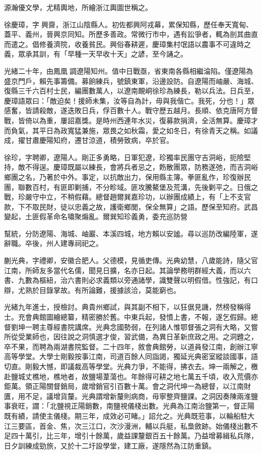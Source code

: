 \begin{pinyinscope}
源瀚優文學，尤精輿地，所繪浙江輿圖世稱之。

徐慶璋，字興齋，浙江山陰縣人。初佐都興阿戎幕，累保知縣，歷任奉天寬甸、蓋平、義州，晉興京同知。所歷多善政。常微行市中，遇有訟爭者，輒為剖其曲直而遣之。倡修養濟院，收養貧民。興俗春耕遲，慶璋集村氓語以農事不可違時之義，眾承其訓，有「早種一天早收十天」之諺，至今誦之。

光緒二十年，由鳳凰調遼陽知州。值中日戰亟，省東南各縣相繼淪陷。僅遼陽為盛京門戶，賴先事籌備。募餉練兵，號鎮東軍，沿邊設防。自遼陽而岫嚴、海城、復縣三千六百村士民，編團數萬人，以遼南靦峒徐珍為練長，勒以兵法。日兵至，慶璋語眾曰：「敵迫矣！援師未集，汝等自為計，毋與我偕亡。我死，分也！」眾感奮，皆請殺敵，遂迭敗日兵，俘百數十人。戰守歷五越月。長順、依克唐阿方督戰，皆倚以為重，屢詔嘉獎。是時州西連年水災，復募款捐濟，全活無算。慶璋才而負氣，其平日為政寬猛兼施，眾畏之如秋霜，愛之如冬日，有徐青天之稱。如議成，擢甘肅慶陽知府，遷甘涼道，積勞致病，卒於官。

徐珍，字聘卿，遼陽人。剛正多勇略，日軍犯遼，珍獨率民團守吉洞峪，扼險堅持，敵不得逞。慶璋既屬以練長，會將兵者忌之，飭散團眾，防務遂弛，而吉洞峪鄉團之名，乃著於中外。事定，以抗敵出力，保用縣主簿。拳匪亂作，珍復辦民團，聯數百村，有匪即剿捕，不分畛域。匪攻騰鰲堡及荒溝，先後剿平之。日俄之戰，珍嚴守中立，不稍假藉。總督趙爾巽嘉珍功，以辦團成績上，有「上不支官款，下不取民財，徒以忠義之故，護衛鄉閭，保全無算」之語。歷保至知府。武昌變起，土匪假革命名嘯聚煽亂。爾巽知珍義勇，委充巡防營

幫統，分防遼陽、海城、岫巖、本溪四城，地方賴以安謐。尋以巡防改編陸軍，遂辭職。卒後，州人建專祠祀之。

蒯光典，字禮卿，安徽合肥人。父德模，見循吏傳。光典幼慧，八歲能詩，隨父官江南，所師友多當代名儒，聞見日擴，名亦日起。其論學務明群經大義，而以六書、九數為樞紐，治六書則必求義類以旁通諸學，識雙聲以明假借。性強記，有口辯，尤熟於目錄掌故。有所論難，援據該洽，莫能窮也。

光緒九年進士，授檢討。典貴州鄉試，與其副不相下，以狂倨見譏，然榜發稱得士。充會典館圖繪總纂，精密勝於舊。中東兵起，發憤上書，不報，遂乞假歸。總督劉坤一聘主尊經書院講席。光典念國勢弱，在列諸人惟鄂督張之洞有大略，又嘗所從受業師也，因往說之洞慎選才俊，習武備，為異日革新庶政之用。之洞韙之，卒不果，而聘為兩湖書院監督。二十四年，敘會典館勞，以道員發江南，創辦江寧高等學堂。大學士剛毅按事江南，司道百餘人同詣謁，獨延光典密室縱談國事，語切直。剛毅大憾，即議裁高等學堂。光典力爭，不能得，拂衣去。坤一兩解之，檄赴鹽城丈樵地，樵地者，故鹽場葦蕩也。年餘得可耕之地七萬五千頃，收入荒價亦鉅萬。領正陽關督銷局，歲增銷官引百數十萬。會之洞代坤一為總督，以江南財匱，用不足，議增貨釐。光典謂增新釐則病商，毋寧整齊鹽課。之洞因奏陳兩淮鹽事衰旺，謂：「北鹽視正陽銷數，南鹽視儀棧出數。光典為江南治鹽第一，督正陽既有績，請使主儀棧。期三年，成效必可睹。」詔允之。光典既蒞事，以輪船駐大江三要區，首金、焦，次三江口，次沙漫洲，輔以兵艇，私梟斂跡。始儀棧出數不足四十萬引，比三年，增引十餘萬，歲益課釐銀百五十餘萬。乃益增募緝私兵隊，日夕訓練成勁旅，又於十二圩設學堂，建工廠，遂隱然為江防重鎮。


\end{pinyinscope}
